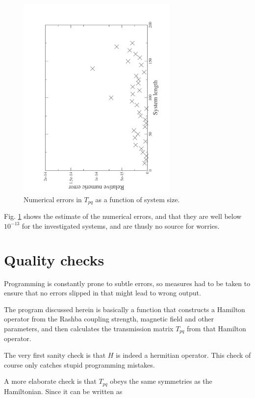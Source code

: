 \begin{figure}
    \includegraphics[angle=270,width=0.7\textwidth]{numeric-errors.pdf}
    \caption{Numerical errors in $T_{pq}$ as a function of system size.}
    \label{fig:numeric-errors}
\end{figure}

Fig. \ref{fig:numeric-errors} shows the estimate of the numerical errors, and
that they are well below $10^{-13}$ for the investigated systems, and are
thusly no source for worries.

\section{Quality checks}

Programming is constantly prone to subtle errors, so measures had to 
be taken to ensure that no errors slipped in that might lead to wrong
output.

The program discussed herein is basically a function that constructs a
Hamilton operator from the Rashba coupling strength, magnetic
field and other parameters, and then calculates the transmission
matrix $T_{pq}$ from that Hamilton operator.

The very first sanity check is that $H$ is indeed a hermitian
operator. This check of course only catches stupid programming
mistakes.

A more elaborate check is that $T_{pq}$ obeys the same symmetries as
the Hamiltonian. Since it can be written as
  
